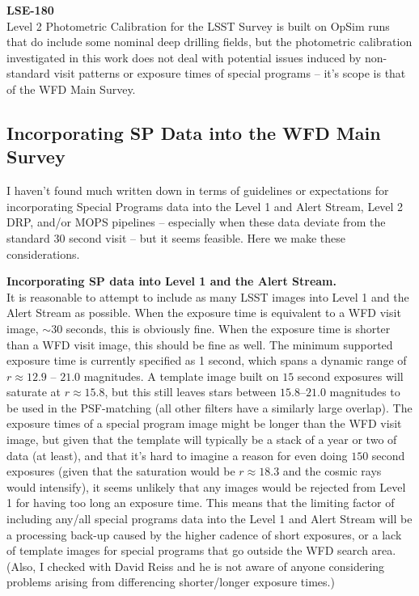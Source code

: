 \documentclass[DM,lsstdraft,toc]{lsstdoc}
\begin{document}
\noindent \textbf{LSE-180}\\
Level 2 Photometric Calibration for the LSST Survey \cite{LSE-180} is built on OpSim runs that do include some nominal deep drilling fields, but the photometric calibration investigated in this work does not deal with potential issues induced by non-standard visit patterns or exposure times of special programs -- it's scope is that of the WFD Main Survey. 


\subsection{Incorporating SP Data into the WFD Main Survey}\label{ssec:dmdocs_SPinWFD}

I haven't found much written down in terms of guidelines or expectations for incorporating Special Programs data into the Level 1 and Alert Stream, Level 2 DRP, and/or MOPS pipelines -- especially when these data deviate from the standard 30 second visit -- but it seems feasible. Here we make these considerations.

\noindent \textbf{Incorporating SP data into Level 1 and the Alert Stream.} \\
It is reasonable to attempt to include as many LSST images into Level 1 and the Alert Stream as possible. When the exposure time is equivalent to a WFD visit image, $\sim 30$ seconds, this is obviously fine. When the exposure time is shorter than a WFD visit image, this should be fine as well. The minimum supported exposure time is currently specified as 1 second, which spans a dynamic range of $r \approx 12.9$ -- $21.0$ magnitudes. A template image built on $15$ second exposures will saturate at $r \approx 15.8$, but this still leaves stars between $15.8$--$21.0$ magnitudes to be used in the PSF-matching (all other filters have a similarly large overlap). The exposure times of a special program image might be longer than the WFD visit image, but given that the template will typically be a stack of a year or two of data (at least), and that it's hard to imagine a reason for even doing $150$ second exposures (given that the saturation would be $r\approx 18.3$ and the cosmic rays would intensify), it seems unlikely that any images would be rejected from Level 1 for having too long an exposure time. This means that the limiting factor of including any/all special programs data into the Level 1 and Alert Stream will be a processing back-up caused by the higher cadence of short exposures, or a lack of template images for special programs that go outside the WFD search area. (Also, I checked with David Reiss and he is not aware of anyone considering problems arising from differencing shorter/longer exposure times.)
\end{document}
